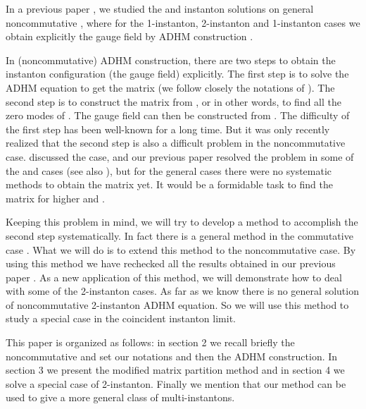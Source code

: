 \documentclass[a4paper,a4paper]{article}
\begin{document}
In a previous paper \cite{TianZhu}, we studied the \coordHE{} and
\coordHE{} instanton solutions on general noncommutative \coordHE{}
\cite{Schwarz}, where for the \coordHE{} 1-instanton, 2-instanton and
\coordHE{} 1-instanton cases we obtain explicitly the gauge field by
ADHM construction \cite{ADHM}.

In (noncommutative) ADHM construction, there are two steps to
obtain the instanton configuration (the gauge field) explicitly.
The first step is to solve the ADHM equation to get the matrix
\myHighlight{$\Delta$}\coordHE{} (we follow closely the notations of \cite{TianZhu}). The
second step is to construct the matrix \coordHE{} from \myHighlight{$\Delta$}\coordHE{}, or in
other words, to find all the zero modes of \myHighlight{$\Delta$}\coordHE{}. The gauge
field can then be constructed from \coordHE{}. The difficulty of the
first step has been well-known for a long time. But it was only
recently realized that the second step is also a difficult problem
in the noncommutative case. \cite{Paperc} discussed the \coordHE{}  \coordHE{} case, and our previous paper \cite{TianZhu} resolved
the problem in some of the \coordHE{} and \coordHE{} cases (see also
\cite{Papera,Paperb,Paperd}), but for the general cases there were
no systematic methods to obtain the matrix \coordHE{} yet. It would be a
formidable task to find the matrix \coordHE{} for higher \coordHE{} and \coordHE{}.

Keeping this problem in mind, we will try to develop a method to
accomplish the second step  systematically. In fact there is a
general method in the commutative case \cite{decomp}. What we will
do is to extend this method to the noncommutative case. By using
this method we have rechecked all the results obtained in our
previous paper \cite{TianZhu}. As a new application of this
method, we will demonstrate how to deal with some of the \coordHE{}
2-instanton cases. As far as we know there is no general solution
of noncommutative \coordHE{} 2-instanton ADHM equation. So we will use
this method to study a special case in the coincident instanton
limit.

This paper is organized as follows: in section 2 we recall briefly
the noncommutative \coordHE{} and set our notations and then the
ADHM construction. In section 3 we present the modified matrix
partition method and in section 4 we solve a special case of
\coordHE{} 2-instanton. Finally we mention that our method can be used
to give a more general class of \coordHE{} multi-instantons.
\end{document}
